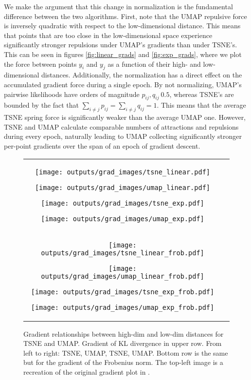 \documentclass[sigconf, nonacm]{acmart}
\begin{document}
We make the argument that this change in normalization is the fundamental difference between the two algorithms. First, note that the UMAP repulsive force is
inversely quadratic with respect to the low-dimensional distance. This means that points that are too close in the low-dimensional space experience
significantly stronger repulsions under UMAP's gradients than under TSNE's. This can be seen in figures \ref{fig:linear_grads} and \ref{fig:exp_grads}, where we
plot the force between points $y_i$ and $y_j$ as a function of their high- and low-dimensional distances.
Additionally, the normalization has a direct effect on the accumulated gradient force during a single epoch.
By not normalizing, UMAP's pairwise likelihoods have orders of magnitude $p_{ij}, q_{ij} ~ 0.5$, whereas TSNE's are bounded by the fact that $\sum_{i \neq j}
p_{ij} = \sum_{i \neq j} q_{ij} = 1$.
This means that the average TSNE spring force is significantly weaker than the average UMAP one.
However, TSNE and UMAP calculate comparable numbers of attractions and repulsions during every epoch, naturally leading to UMAP collecting significantly
stronger per-point gradients over the span of an epoch of gradient descent.


\begin{figure*}[h]
    \begin{tabular}{cc}
        \texttt{[image: outputs/grad\_images/tsne\_linear.pdf]}\par
        \texttt{[image: outputs/grad\_images/umap\_linear.pdf]}\par
        \texttt{[image: outputs/grad\_images/tsne\_exp.pdf]}\par
        \texttt{[image: outputs/grad\_images/umap\_exp.pdf]}\\
        \texttt{[image: outputs/grad\_images/tsne\_linear\_frob.pdf]}\par
        \texttt{[image: outputs/grad\_images/umap\_linear\_frob.pdf]}\par
        \texttt{[image: outputs/grad\_images/tsne\_exp\_frob.pdf]}\par
        \texttt{[image: outputs/grad\_images/umap\_exp\_frob.pdf]}
    \end{tabular}
\caption{Gradient relationships between high-dim and low-dim distances for TSNE and UMAP. Gradient of KL divergence in upper row. From left to right: TSNE,
UMAP, TSNE, UMAP. Bottom row is the same but for the gradient of the Frobenius norm. The top-left image is a recreation of the original gradient plot in
\cite{van2008visualizing}.}
\end{figure*}
\end{document}
